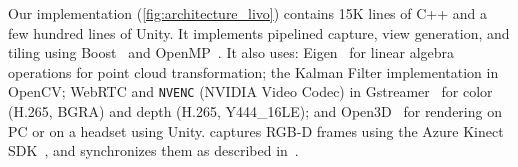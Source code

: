 %
Our \livo implementation (\cref{fig:architecture_livo}) contains 15K lines of C++ and a few hundred lines of Unity.
%
It implements pipelined capture, view generation, and tiling using Boost~\cite{boost} and OpenMP~\cite{openmp}.
%
It also uses: Eigen~\cite{eigen} for linear algebra operations for point cloud transformation; the Kalman Filter implementation in OpenCV; WebRTC and \texttt{NVENC} (NVIDIA Video Codec) in Gstreamer~\cite{gstreamer-nvenc} for color (H.265, BGRA) and depth (H.265, Y444\_16LE); and Open3D~\cite{open3d} for rendering on PC or on a headset using Unity.
%
\livo{} captures RGB-D frames using the Azure Kinect SDK~\cite{kinect-sdk}, and synchronizes them as described in~\cite{kinect-sync}.

